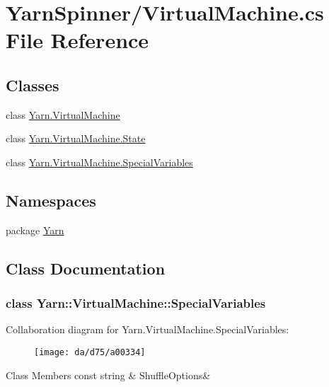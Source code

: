 \hypertarget{a00271}{\section{Yarn\-Spinner/\-Virtual\-Machine.cs File Reference}
\label{a00271}
}
\subsection*{Classes}
\begin{DoxyCompactItemize}
\item 
class \hyperlink{a00138}{Yarn.\-Virtual\-Machine}
\item 
class \hyperlink{a00141}{Yarn.\-Virtual\-Machine.\-State}
\item 
class \hyperlink{a00138_de/de9/a00322}{Yarn.\-Virtual\-Machine.\-Special\-Variables}
\end{DoxyCompactItemize}
\subsection*{Namespaces}
\begin{DoxyCompactItemize}
\item 
package \hyperlink{a00031}{Yarn}
\end{DoxyCompactItemize}


\subsection{Class Documentation}
\label{de/de9/a00322}
\hypertarget{a00138_de/de9/a00322}{}
\subsubsection{class Yarn\-:\-:Virtual\-Machine\-:\-:Special\-Variables}


Collaboration diagram for Yarn.\-Virtual\-Machine.\-Special\-Variables\-:
\nopagebreak
\begin{figure}[H]
\begin{center}
\leavevmode
\texttt{[image: da/d75/a00334]}
\end{center}
\end{figure}
\begin{DoxyFields}{Class Members}
\hypertarget{a00138_aecbb8ab9becd96457d836100b2818078}{const string}\label{a00138_aecbb8ab9becd96457d836100b2818078}
&
Shuffle\-Options&
\\
\hline

\end{DoxyFields}
